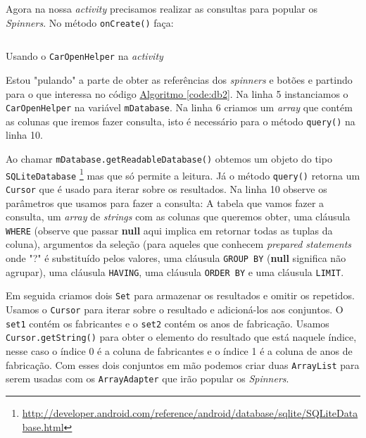 \documentclass[a4paper,12pt,brazil,oneside]{book}
\begin{document}
		Agora na nossa \emph{activity} precisamos realizar as consultas para popular os \emph{Spinners}. No método \texttt{onCreate()} faça: 

		\begin{listing}[H]
		\inputminted[linenos=true,fontsize=\small,frame=lines, framesep=2mm, tabsize=2,numbersep=5pt]{java}{src/api/storage/db2.java}
		\caption{Usando o \texttt{CarOpenHelper} na \emph{activity}}
		\label{code:db2}
		\end{listing} 	

		Estou "pulando" a parte de obter as referências dos \emph{spinners} e botões e partindo para o que interessa no código \hyperref[code:db2]{Algoritmo \ref*{code:db2}}. Na linha 5 instanciamos o \texttt{CarOpenHelper} na variável \texttt{mDatabase}. Na linha 6 criamos um \emph{array} que contém as colunas que iremos fazer consulta, isto é necessário para o método \texttt{query()} na linha 10.

		Ao chamar \texttt{mDatabase.getReadableDatabase()} obtemos um objeto do tipo \\ \texttt{SQLiteDatabase}
\footnote{\href{http://developer.android.com/reference/android/database/sqlite/SQLiteDatabase.html}{http://developer.android.com/reference/android/database/sqlite/SQLiteDatabase.html}}
 mas que só permite a leitura. Já o método \texttt{query()} retorna um \texttt{Cursor} que é usado para iterar sobre os resultados. Na linha 10 observe os parâmetros que usamos para fazer a consulta: A tabela que vamos fazer a consulta, um \emph{array} de \emph{strings} com as colunas que queremos obter,  uma cláusula \texttt{WHERE} (observe que passar \textbf{null} aqui implica em retornar todas as tuplas da coluna), argumentos da seleção (para aqueles que conhecem \emph{prepared statements} onde "?" é substituído pelos valores, uma cláusula \texttt{GROUP BY} (\textbf{null} significa não agrupar), uma cláusula \texttt{HAVING}, uma cláusula \texttt{ORDER BY} e uma cláusula \texttt{LIMIT}.

	Em seguida criamos dois \texttt{Set} para armazenar os resultados e omitir os repetidos. Usamos o \texttt{Cursor} para iterar sobre o resultado e adicioná-los aos conjuntos. O \texttt{set1} contém os fabricantes e o \texttt{set2} contém os anos de fabricação. Usamos \texttt{Cursor.getString()} para obter o elemento do resultado que está naquele índice, nesse caso o índice 0 é a coluna de fabricantes e o índice 1 é a coluna de anos de fabricação. Com esses dois conjuntos em mão podemos criar duas \texttt{ArrayList} para serem usadas com os \texttt{ArrayAdapter} que irão popular os \emph{Spinners}.
\end{document}
